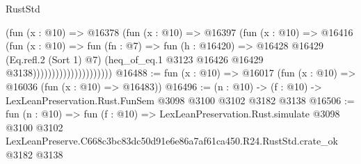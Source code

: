 \begin{lexlean}{RustStd}
\begin{coremodule}
                                    (fun (x : @10) =>
                                    @16378
                                      (fun (x : @10) =>
                                      @16397
                                        (fun (x : @10) =>
                                        @16416
                                          (fun (x : @10) =>
                                          fun (fn : @7) =>
                                          fun (h : @16420) =>
                                          @16428
                                            @16429
                                            (Eq.refl.{2} (Sort 1) @7)
                                            (heq_of_eq.{1}
                                              @3123
                                              @16426
                                              @16429
                                              @3138)))))))))))))))))))))
@16488 := fun (x : @10) => @16017 (fun (x : @10) => @16036 (fun (x : @10) => @16483))
@16496 := (n : @10) -> (f : @10) -> LexLeanPreservation.Rust.FunSem @3098 @3100 @3102 @3182 @3138
@16506 := fun (n : @10) =>
  fun (f : @10) =>
  LexLeanPreservation.Rust.simulate
    @3098
    @3100
    @3102
    LexLeanPreserve.C668c3bc83dc50d91e6e86a7af61ca450.R24.RustStd.crate_ok
    @3182
    @3138
\end{coremodule}
\end{lexlean}
